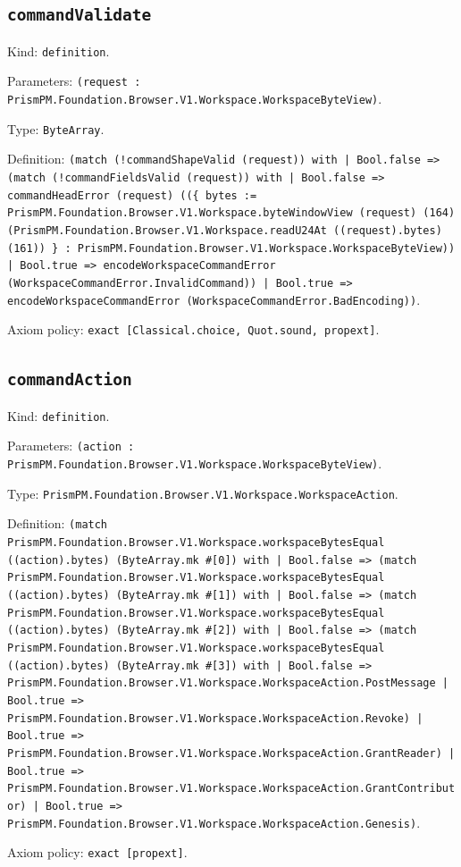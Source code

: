\documentclass[11pt]{article}
\begin{document}
\subsection*{\texttt{commandValidate}}
\noindent Kind: \texttt{definition}.\par
\noindent Parameters: \texttt{(request : PrismPM.Foundation.Browser.V1.Workspace.WorkspaceByteView)}.\par
\noindent Type: \texttt{ByteArray}.\par
\noindent Definition: \texttt{(match (!commandShapeValid (request)) with | Bool.false => (match (!commandFieldsValid (request)) with | Bool.false => commandHeadError (request) ((\{ bytes := PrismPM.Foundation.Browser.V1.Workspace.byteWindowView (request) (164) (PrismPM.Foundation.Browser.V1.Workspace.readU24At ((request).bytes) (161)) \} : PrismPM.Foundation.Browser.V1.Workspace.WorkspaceByteView)) | Bool.true => encodeWorkspaceCommandError (WorkspaceCommandError.InvalidCommand)) | Bool.true => encodeWorkspaceCommandError (WorkspaceCommandError.BadEncoding))}.\par
\noindent Axiom policy: \texttt{exact [Classical.choice, Quot.sound, propext]}.\par
\subsection*{\texttt{commandAction}}
\noindent Kind: \texttt{definition}.\par
\noindent Parameters: \texttt{(action : PrismPM.Foundation.Browser.V1.Workspace.WorkspaceByteView)}.\par
\noindent Type: \texttt{PrismPM.Foundation.Browser.V1.Workspace.WorkspaceAction}.\par
\noindent Definition: \texttt{(match PrismPM.Foundation.Browser.V1.Workspace.workspaceBytesEqual ((action).bytes) (ByteArray.mk \#[0]) with | Bool.false => (match PrismPM.Foundation.Browser.V1.Workspace.workspaceBytesEqual ((action).bytes) (ByteArray.mk \#[1]) with | Bool.false => (match PrismPM.Foundation.Browser.V1.Workspace.workspaceBytesEqual ((action).bytes) (ByteArray.mk \#[2]) with | Bool.false => (match PrismPM.Foundation.Browser.V1.Workspace.workspaceBytesEqual ((action).bytes) (ByteArray.mk \#[3]) with | Bool.false => PrismPM.Foundation.Browser.V1.Workspace.WorkspaceAction.PostMessage | Bool.true => PrismPM.Foundation.Browser.V1.Workspace.WorkspaceAction.Revoke) | Bool.true => PrismPM.Foundation.Browser.V1.Workspace.WorkspaceAction.GrantReader) | Bool.true => PrismPM.Foundation.Browser.V1.Workspace.WorkspaceAction.GrantContributor) | Bool.true => PrismPM.Foundation.Browser.V1.Workspace.WorkspaceAction.Genesis)}.\par
\noindent Axiom policy: \texttt{exact [propext]}.\par
\end{document}
